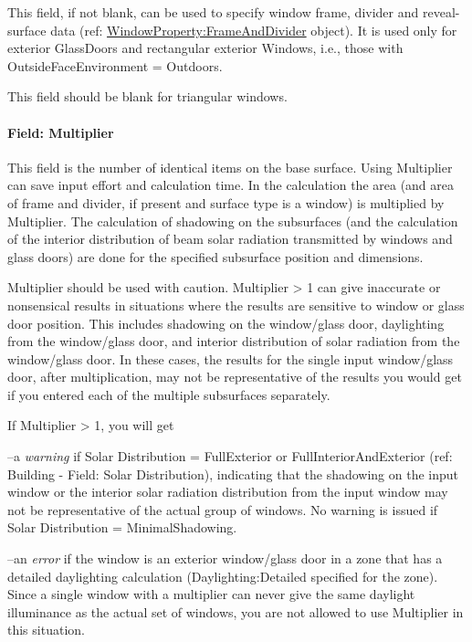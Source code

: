 This field, if not blank, can be used to specify window frame, divider and reveal-surface data (ref: \hyperref[windowpropertyframeanddivider]{WindowProperty:FrameAndDivider} object). It is used only for exterior GlassDoors and rectangular exterior Windows, i.e., those with OutsideFaceEnvironment = Outdoors.

This field should be blank for triangular windows.

\paragraph{Field: Multiplier}\label{field-multiplier-1}

This field is the number of identical items on the base surface. Using Multiplier can save input effort and calculation time. In the calculation the area (and area of frame and divider, if present and surface type is a window) is multiplied by Multiplier. The calculation of shadowing on the subsurfaces (and the calculation of the interior distribution of beam solar radiation transmitted by windows and glass doors) are done for the specified subsurface position and dimensions.

Multiplier should be used with caution. Multiplier \textgreater{} 1 can give inaccurate or nonsensical results in situations where the results are sensitive to window or glass door position. This includes shadowing on the window/glass door, daylighting from the window/glass door, and interior distribution of solar radiation from the window/glass door. In these cases, the results for the single input window/glass door, after multiplication, may not be representative of the results you would get if you entered each of the multiple subsurfaces separately.

If Multiplier \textgreater{} 1, you will get

--a \emph{warning} if Solar Distribution = FullExterior or FullInteriorAndExterior (ref: Building - Field: Solar Distribution), indicating that the shadowing on the input window or the interior solar radiation distribution from the input window may not be representative of the actual group of windows. No warning is issued if Solar Distribution = MinimalShadowing.

--an \emph{error} if the window is an exterior window/glass door in a zone that has a detailed daylighting calculation (Daylighting:Detailed specified for the zone). Since a single window with a multiplier can never give the same daylight illuminance as the actual set of windows, you are not allowed to use Multiplier in this situation.

